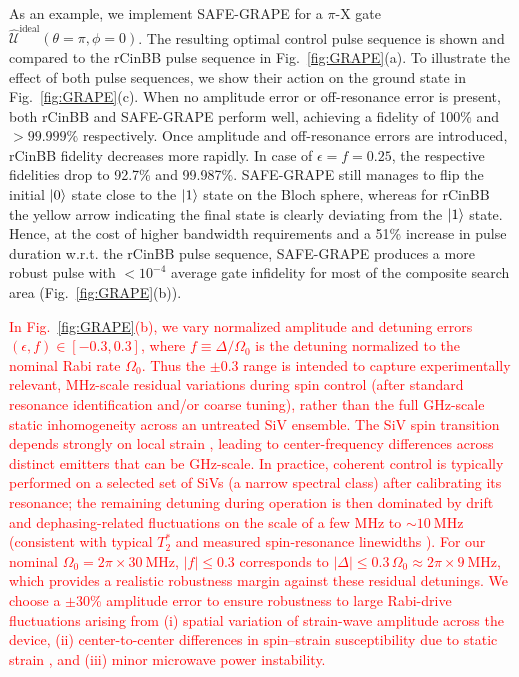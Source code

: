 \documentclass[%
 reprint,
 superscriptaddress,
 amsmath,amssymb,
 aps,
 prx,
]{revtex4-2}
\newcommand{\rev}[1]{\textcolor{red}{#1}}
\begin{document}
As an example, we implement SAFE-GRAPE for a $\pi$-X gate  $\hat{\mathcal{U}}^{\text{ideal}}(\theta=\pi, \phi=0)$. The resulting optimal control pulse sequence is shown and compared to the rCinBB pulse sequence in Fig.~\ref{fig:GRAPE}(a). To illustrate the effect of both pulse sequences, we show their action on the ground state in Fig.~\ref{fig:GRAPE}(c). When no amplitude error or off-resonance error is present, both rCinBB and SAFE-GRAPE perform well, achieving a fidelity of 100\% and $>99.999\%$ respectively. Once amplitude and off-resonance errors are introduced, rCinBB fidelity decreases more rapidly. In case of $\epsilon=f=0.25$, the respective fidelities drop to 92.7\% and 99.987\%. SAFE-GRAPE still manages to flip the initial $\ket{0}$ state close to the $\ket{1}$ state on the Bloch sphere, whereas for rCinBB the yellow arrow indicating the final state is clearly deviating from the $\ket{1}$ state. Hence, at the cost of higher bandwidth requirements and a 51\% increase in pulse duration w.r.t. the rCinBB pulse sequence, SAFE-GRAPE produces a more robust pulse with $<10^{-4}$ average gate infidelity for most of the composite search area (Fig.~\ref{fig:GRAPE}(b)). 

\rev{In Fig.~\ref{fig:GRAPE}(b), we vary normalized amplitude and detuning errors $(\epsilon,f)\in[-0.3,0.3]$, where $f \equiv \Delta/\Omega_{0}$ is the detuning normalized to the nominal Rabi rate $\Omega_{0}$. Thus the $\pm 0.3$ range is intended to capture experimentally relevant, MHz-scale residual variations during spin control (after standard resonance identification and/or coarse tuning), rather than the full GHz-scale static inhomogeneity across an untreated SiV ensemble. The SiV spin transition depends strongly on local strain \cite{PhysRevB.97.205444}, leading to center-frequency differences across distinct emitters that can be GHz-scale. In practice, coherent control is typically performed on a selected set of SiVs (a narrow spectral class) after calibrating its resonance; the remaining detuning during operation is then dominated by drift and dephasing-related fluctuations on the scale of a few MHz to $\sim 10~\mathrm{MHz}$ (consistent with typical $T_2^{*}$ and measured spin-resonance linewidths \cite{pingault_coherent_2017}). For our nominal $\Omega_{0} = 2\pi \times 30~\mathrm{MHz}$, $|f| \le 0.3$ corresponds to $|\Delta| \le 0.3\,\Omega_{0} \approx 2\pi \times 9~\mathrm{MHz}$, which provides a realistic robustness margin against these residual detunings.
We choose a $\pm$30\% amplitude error to ensure robustness to large Rabi-drive fluctuations arising from (i) spatial variation of strain-wave amplitude across the device, (ii) center-to-center differences in spin–strain susceptibility due to static strain \cite{PhysRevB.97.205444}, and (iii) minor microwave power instability.}
\end{document}
